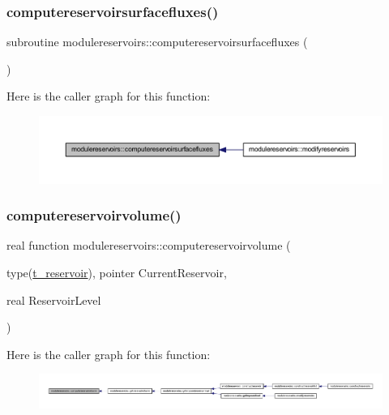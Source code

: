 \subsubsection{\texorpdfstring{computereservoirsurfacefluxes()}{computereservoirsurfacefluxes()}}
{\footnotesize\ttfamily subroutine modulereservoirs\+::computereservoirsurfacefluxes (\begin{DoxyParamCaption}{ }\end{DoxyParamCaption})\hspace{0.3cm}{\ttfamily [private]}}

Here is the caller graph for this function\+:\nopagebreak
\begin{figure}[H]
\begin{center}
\leavevmode
\includegraphics[width=350pt]{namespacemodulereservoirs_ae746634227400b0849469114a5dc5c3f_icgraph}
\end{center}
\end{figure}
\mbox{\label{namespacemodulereservoirs_a5482b1f1fc7530ca5302b5dc3352566f}} 
\subsubsection{\texorpdfstring{computereservoirvolume()}{computereservoirvolume()}}
{\footnotesize\ttfamily real function modulereservoirs\+::computereservoirvolume (\begin{DoxyParamCaption}\item[{type(\mbox{\hyperlink{structmodulereservoirs_1_1t__reservoir}{t\+\_\+reservoir}}), pointer}]{Current\+Reservoir,  }\item[{real}]{Reservoir\+Level }\end{DoxyParamCaption})\hspace{0.3cm}{\ttfamily [private]}}

Here is the caller graph for this function\+:\nopagebreak
\begin{figure}[H]
\begin{center}
\leavevmode
\includegraphics[width=350pt]{namespacemodulereservoirs_a5482b1f1fc7530ca5302b5dc3352566f_icgraph}
\end{center}
\end{figure}
\mbox{\label{namespacemodulereservoirs_afd25bc9bcd078252383e6f67ef148826}} 
